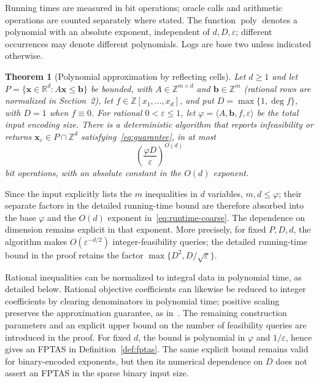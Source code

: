 \documentclass[final,5p,times,twocolumn]{elsarticle}
\newtheorem{theorem}{Theorem}[section]
\theoremstyle{definition}\newtheorem{definition}{Definition}[section]
\theoremstyle{remark}\newtheorem{remark}[theorem]{Remark}
\newcommand{\R}{\mathbb R}\newcommand{\Q}{\mathbb Q}\newcommand{\Z}{\mathbb Z}
\newcommand{\eps}{\varepsilon}
\newcommand{\poly}{\operatorname{poly}}
\begin{document}
Running times are measured in bit operations; oracle calls and arithmetic operations are counted separately where stated. The function $\poly$ denotes a polynomial with an absolute exponent, independent of $d,D,\eps$; different occurrences may denote different polynomials. Logs are base two unless indicated otherwise.

\begin{theorem}[Polynomial approximation by reflecting cells]\label{thm:main}
Let $d\ge1$ and let $P=\{\mathbf{x}\in\R^d:A\mathbf{x}\le\mathbf b\}$ be bounded, with $A\in\Z^{m\times d}$ and $\mathbf b\in\Z^m$ (rational rows are normalized in Section~2), let $f\in\Z[x_1,\ldots,x_d]$, and put $D=\max\{1,\deg f\}$, with $D=1$ when $f\equiv0$. For rational $0<\eps\le1$, let $\varphi=\langle A,\mathbf b,f,\eps\rangle$ be the total input encoding size.
There is a deterministic algorithm that reports infeasibility or returns $\mathbf{x}_{\eps}\in P\cap\Z^d$ satisfying~\eqref{eq:guarantee}, in at most
\begin{equation}\label{eq:runtime-coarse}
 \left(\frac{\varphi D}{\eps}\right)^{O(d)}
\end{equation}
bit operations, with an absolute constant in the $O(d)$ exponent.
\end{theorem}

Since the input explicitly lists the $m$ inequalities in $d$ variables, $m,d\le\varphi$; their separate factors in the detailed running-time bound are therefore absorbed into the base $\varphi$ and the $O(d)$ exponent in~\eqref{eq:runtime-coarse}. The dependence on dimension remains explicit in that exponent. More precisely, for fixed $P,D,d$, the algorithm makes $O(\eps^{-d/2})$ integer-feasibility queries; the detailed running-time bound in the proof retains the factor $\max\{D^2,D/\sqrt\eps\}$.

Rational inequalities can be normalized to integral data in polynomial time, as detailed below. Rational objective coefficients can likewise be reduced to integer coefficients by clearing denominators in polynomial time; positive scaling preserves the approximation guarantee, as in~\cite[Section~5]{DHKW08}. The remaining construction parameters and an explicit upper bound on the number of feasibility queries are introduced in the proof. For fixed $d$, the bound is polynomial in $\varphi$ and $1/\eps$, hence gives an FPTAS in Definition~\ref{def:fptas}. The same explicit bound remains valid for binary-encoded exponents, but then its numerical dependence on $D$ does not assert an FPTAS in the sparse binary input size.
\end{document}
